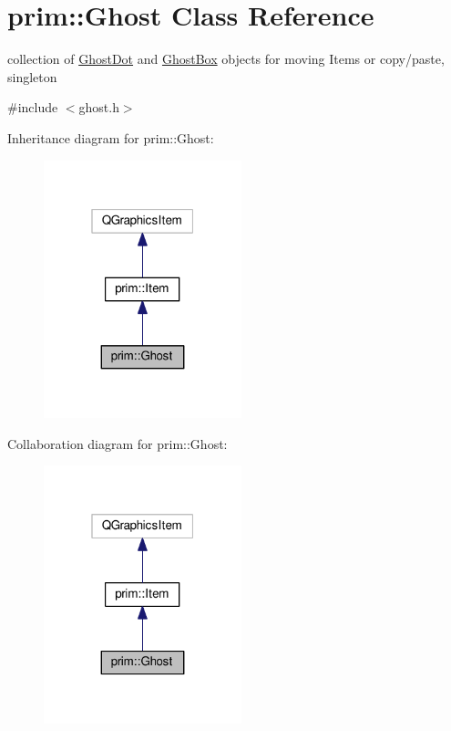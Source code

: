 \hypertarget{classprim_1_1Ghost}{}\section{prim\+:\+:Ghost Class Reference}
\label{classprim_1_1Ghost}


collection of \hyperlink{classprim_1_1GhostDot}{Ghost\+Dot} and \hyperlink{classprim_1_1GhostBox}{Ghost\+Box} objects for moving Items or copy/paste, singleton  




{\ttfamily \#include $<$ghost.\+h$>$}



Inheritance diagram for prim\+:\+:Ghost\+:\nopagebreak
\begin{figure}[H]
\begin{center}
\leavevmode
\includegraphics[width=163pt]{classprim_1_1Ghost__inherit__graph}
\end{center}
\end{figure}


Collaboration diagram for prim\+:\+:Ghost\+:\nopagebreak
\begin{figure}[H]
\begin{center}
\leavevmode
\includegraphics[width=163pt]{classprim_1_1Ghost__coll__graph}
\end{center}
\end{figure}
